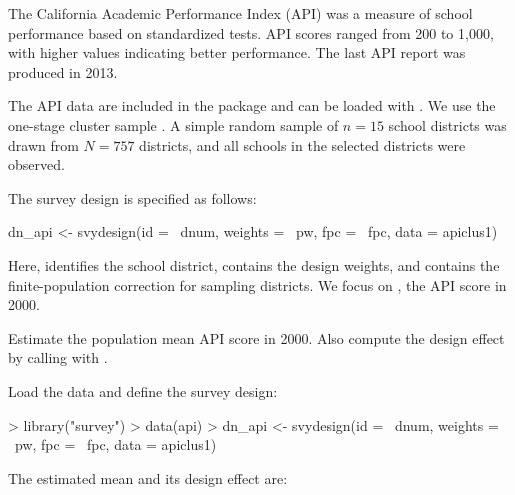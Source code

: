




\begin{Problem}
    The California Academic Performance Index (API) was a measure of school
    performance based on standardized tests. API scores ranged from 200 to
    1,000, with higher values indicating better performance. The last API
    report was produced in 2013.

    \vspace{0.25em}

    The API data are included in the  package and can be loaded
    with . We use the one-stage cluster sample
    . A simple random sample of $n = 15$ school districts was
    drawn from $N = 757$ districts, and all schools in the selected districts
    were observed.

    \vspace{0.25em}

    The survey design is specified as follows:

\begin{Scode}
dn_api <- svydesign(id = ~dnum, weights = ~pw, fpc = ~fpc, data = apiclus1)
\end{Scode}

    Here,  identifies the school district,  contains the
    design weights, and  contains the finite-population correction
    for sampling districts. We focus on , the API score in 2000.

\begin{Subtask}
    \item Estimate the population mean API score in 2000. Also compute the
        design effect by calling  with .

    \begin{Solution}
        Load the data and define the survey design:

\begin{Schunk}
\begin{Sinput}
> library("survey")
> data(api)
> dn_api <- svydesign(id = ~dnum, weights = ~pw, fpc = ~fpc, data = apiclus1)
\end{Sinput}
\end{Schunk}

        The estimated mean and its design effect are:


\end{Solution}
\end{Subtask}
\end{Problem}
